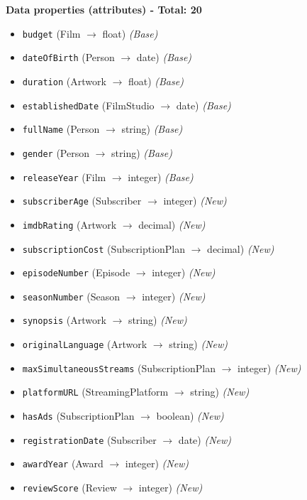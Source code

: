 \vspace{0.5cm}
\noindent\textbf{Data properties (attributes) - Total: 20}
\begin{itemize}
    \item \texttt{budget} (Film $\rightarrow$ float) \textit{(Base)}
    \item \texttt{dateOfBirth} (Person $\rightarrow$ date) \textit{(Base)}
    \item \texttt{duration} (Artwork $\rightarrow$ float) \textit{(Base)}
    \item \texttt{establishedDate} (FilmStudio $\rightarrow$ date) \textit{(Base)}
    \item \texttt{fullName} (Person $\rightarrow$ string) \textit{(Base)}
    \item \texttt{gender} (Person $\rightarrow$ string) \textit{(Base)}
    \item \texttt{releaseYear} (Film $\rightarrow$ integer) \textit{(Base)}
    \item \texttt{subscriberAge} (Subscriber $\rightarrow$ integer) \textit{(New)}
    \item \texttt{imdbRating} (Artwork $\rightarrow$ decimal) \textit{(New)}
    \item \texttt{subscriptionCost} (SubscriptionPlan $\rightarrow$ decimal) \textit{(New)}
    \item \texttt{episodeNumber} (Episode $\rightarrow$ integer) \textit{(New)}
    \item \texttt{seasonNumber} (Season $\rightarrow$ integer) \textit{(New)}
    \item \texttt{synopsis} (Artwork $\rightarrow$ string) \textit{(New)}
    \item \texttt{originalLanguage} (Artwork $\rightarrow$ string) \textit{(New)}
    \item \texttt{maxSimultaneousStreams} (SubscriptionPlan $\rightarrow$ integer) \textit{(New)}
    \item \texttt{platformURL} (StreamingPlatform $\rightarrow$ string) \textit{(New)}
    \item \texttt{hasAds} (SubscriptionPlan $\rightarrow$ boolean) \textit{(New)}
    \item \texttt{registrationDate} (Subscriber $\rightarrow$ date) \textit{(New)}
    \item \texttt{awardYear} (Award $\rightarrow$ integer) \textit{(New)}
    \item \texttt{reviewScore} (Review $\rightarrow$ integer) \textit{(New)}
\end{itemize}

